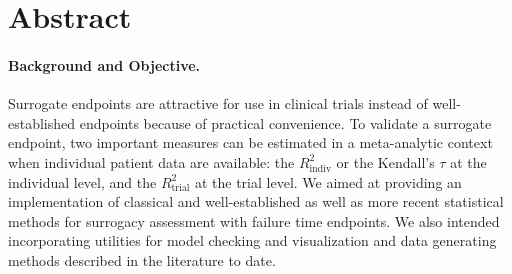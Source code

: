 \documentclass[]{scrartcl}\usepackage[]{graphicx}\usepackage[]{color}
\begin{document}
{%
%     
  
\onehalfspacing
\section*{Abstract}
  \paragraph{Background and Objective.}
  Surrogate endpoints are attractive for use in clinical trials
    instead of well-established endpoints because of practical convenience.
  To validate a surrogate endpoint,
    two important measures can be estimated in a meta-analytic context
    when individual patient data are available:
    the $R^2_\text{indiv}$ or the Kendall's $\tau$ at the individual level,
    and the  $R^2_\text{trial}$ at the trial level.
  We aimed at providing an  implementation of
    classical and well-established as well as more recent statistical methods
    for surrogacy assessment with failure time endpoints.
  We also intended incorporating utilities for model checking and visualization
    and data generating methods described in the literature to date.
}
\end{document}
